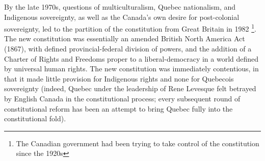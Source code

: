 \documentclass[12pt,oneside]{memoir}
\begin{document}
By the late 1970s, questions of multiculturalism, Quebec nationalism, and Indigenous sovereignty, as well as the Canada's own desire for post-colonial sovereignty, led to the partition of the constitution from Great Britain in 1982 \footnote{The Canadian government had been trying to take control of the constitution since the 1920s}. The new constitution was essentially an amended British North America Act (1867), with defined provincial-federal division of powers, and the addition of a Charter of Rights and Freedoms proper to a liberal-democracy in a world defined by universal human rights. The new constitution was immediately contentious, in that it made little provision for Indigenous rights and none for Quebecois sovereignty (indeed, Quebec under the leadership of Rene Levesque felt betrayed by English Canada in the constitutional process; every subsequent round of constitutional reform has been an attempt to bring Quebec fully into the constitutional fold). 
\end{document}
